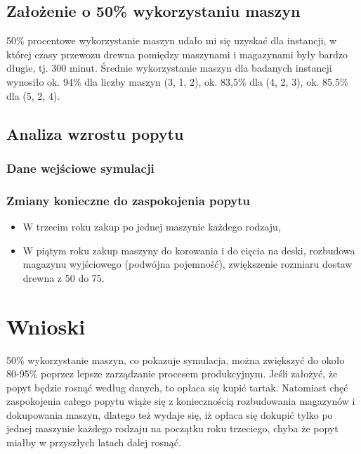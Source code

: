 \documentclass[a4paper]{article}
\begin{document}
\subsection{Założenie o 50\% wykorzystaniu maszyn}
50\% procentowe wykorzystanie maszyn udało mi się uzyskać dla instancji, w której czasy przewozu drewna pomiędzy maszynami i magazynami były bardzo długie, tj. 300 minut.
Średnie wykorzystanie maszyn dla badanych instancji wynosiło ok. 94\% dla liczby maszyn (3, 1, 2), ok. 83,5\% dla (4, 2, 3), ok. 85.5\% dla (5, 2, 4).
\subsection{Analiza wzrostu popytu}
\subsubsection{Dane wejściowe symulacji}

\subsubsection{Zmiany konieczne do zaspokojenia popytu}
\begin{itemize}
\item W trzecim roku zakup po jednej maszynie każdego rodzaju,
\item W piątym roku zakup maszyny do korowania i do cięcia na deski, rozbudowa magazynu wyjściowego (podwójna pojemność), zwiększenie rozmiaru dostaw drewna z 50 do 75.
\end{itemize}
\section{Wnioski}
50\% wykorzystanie maszyn, co pokazuje symulacja, można zwiększyć do około 80-95\% poprzez lepsze zarządzanie procesem produkcyjnym. Jeśli założyć, że popyt będzie rosnąć według danych, to opłaca się kupić tartak. Natomiast chęć zaspokojenia całego popytu wiąże się z koniecznością rozbudowania magazynów i dokupowania maszyn, dlatego też wydaje się, iż opłaca się dokupić tylko po jednej maszynie każdego rodzaju na początku roku trzeciego, chyba że popyt miałby w przyszłych latach dalej rosnąć.
{}

\end{document}
